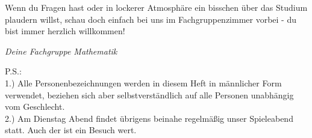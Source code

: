 
Wenn du Fragen hast oder in lockerer Atmosphäre
ein bisschen über das Studium plaudern willst,
schau doch einfach bei uns im Fachgruppenzimmer vorbei
- du bist immer herzlich willkommen!

\begin{flushright}{ \it Deine Fachgruppe Mathematik}
\end{flushright}
\vspace*{\fill}
{\small P.S.:\\
1.) Alle Personenbezeichnungen werden in diesem Heft
in männlicher Form verwendet,
beziehen sich aber selbstverständlich
auf alle Personen unabhängig vom Geschlecht.\\[2pt]
2.) Am Dienstag Abend findet übrigens beinahe regelmäßig
unser Spieleabend statt.
Auch der ist ein Besuch wert.}

 
